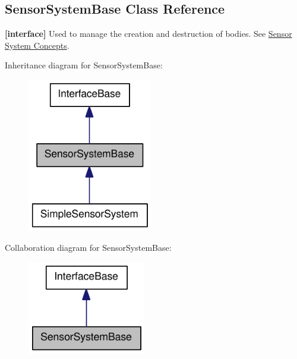 \hypertarget{classOpenRAVE_1_1SensorSystemBase}{
\subsection{SensorSystemBase Class Reference}
\label{classOpenRAVE_1_1SensorSystemBase}
}


{\bfseries \mbox{[}interface\mbox{]}} Used to manage the creation and destruction of bodies. See \hyperlink{arch__sensorsystem}{Sensor System Concepts}.  




Inheritance diagram for SensorSystemBase:\nopagebreak
\begin{figure}[H]
\begin{center}
\leavevmode
\includegraphics[width=154pt]{classOpenRAVE_1_1SensorSystemBase__inherit__graph}
\end{center}
\end{figure}


Collaboration diagram for SensorSystemBase:\nopagebreak
\begin{figure}[H]
\begin{center}
\leavevmode
\includegraphics[width=146pt]{classOpenRAVE_1_1SensorSystemBase__coll__graph}
\end{center}
\end{figure}
